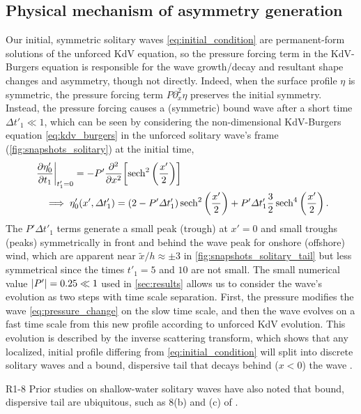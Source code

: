 \documentclass{jfm}
\begin{document}
\subsection{\label{sec:physical_reason} Physical mechanism of asymmetry
generation}
Our initial, symmetric solitary waves \cref{eq:initial_condition} are
permanent-form solutions of the unforced KdV equation, so the pressure
forcing term in the KdV-Burgers equation is responsible for the wave
growth/decay and resultant shape changes and asymmetry, though not
directly.
Indeed, when the surface profile $\eta$ is symmetric, the pressure
forcing term $P \partial_x^2 \eta$ preserves the initial symmetry.
Instead, the pressure forcing causes a (symmetric) bound wave after a
short time $\Delta t'_1 \ll 1$, which can be seen by considering the
non-dimensional KdV-Burgers equation \cref{eq:kdv_burgers} in the
unforced solitary wave's frame (\cref{fig:snapshots_solitary}) at the
initial time,
\begin{align}
  &\eval{\pdv{\eta'_0}{t_1}}_{t'_1=0} = -P' \pdv[2]{x} \bqty{
  \sech^2\pqty{\frac{x'}{2}}}
  \\
  &\quad \implies \eta'_0(x', \Delta t'_1) =
  (2-P'\Delta t'_1) \sech^2\pqty{\frac{x'}{2}}
  +
  P' \Delta t'_1 \frac{3}{2}\sech^4\pqty{\frac{x'}{2}}
  \,.
  \label{eq:pressure_change}
\end{align}
The $P'\Delta t'_1$ terms generate a small peak (trough) at $x'=0$ and
small troughs (peaks) symmetrically in front and behind the wave peak
for onshore (offshore) wind, which are apparent near $\tilde{x}/h
\approx \pm 3$ in \cref{fig:snapshots_solitary_tail} but less
symmetrical since the times $t'_1 = 5$ and $10$ are not small.
The small numerical value $\abs{P'} = 0.25 \ll 1$ used in
\cref{sec:results} allows us to consider the wave's evolution as two
steps with time scale separation.
First, the pressure modifies the wave \cref{eq:pressure_change} on the
slow time scale, and then the wave evolves on a fast time scale from
this new profile according to unforced KdV evolution.
This evolution is described by the inverse scattering transform, which
shows that any localized, initial profile differing from
\cref{eq:initial_condition} will split into discrete solitary waves and
a bound, dispersive tail that decays behind ($x<0$) the wave
\citep[\eg][]{mei2005nonlinear}.
\begin{LineLabel}{R1-8}
Prior studies on shallow-water solitary waves have also noted that
bound, dispersive tail are ubiquitous, such as \figsname{} 8(b) and (c)
of \citet{hammack1974korteweg}.
\end{LineLabel}
\end{document}
